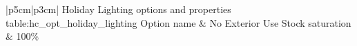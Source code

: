 \begin{customLongTable}{ |p{5cm}|p{3cm}| }
{Holiday Lighting options and properties} {table:hc_opt_holiday_lighting}
{Option name & No Exterior Use}
\endhead
\hline
Stock saturation & 100\% \\ \hline
\end{customLongTable}
